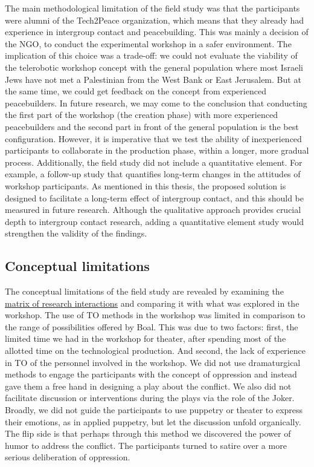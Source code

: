 \documentclass[dissertation,math,vertlayout,pdfa,colorlinks]{aaltoseries}
\begin{document}
The main methodological limitation of the field study was that the participants were alumni of the Tech2Peace organization, which means that they already had experience in intergroup contact and peacebuilding. This was mainly a decision of the NGO, to conduct the experimental workshop in a safer environment. The implication of this choice was a trade-off: we could not evaluate the viability of the telerobotic workshop concept with the general population where most Israeli Jews have not met a Palestinian from the West Bank or East Jerusalem. But at the same time, we could get feedback on the concept from experienced peacebuilders. In future research, we may come to the conclusion that conducting the first part of the workshop (the creation phase) with more experienced peacebuilders and the second part in front of the general population is the best configuration. However, it is imperative that we test the ability of inexperienced participants to collaborate in the production phase, within a longer, more gradual process. Additionally, the field study did not include a quantitative element. For example, a follow-up study that quantifies long-term changes in the attitudes of workshop participants. As mentioned in this thesis, the proposed solution is designed to facilitate a long-term effect of intergroup contact, and this should be measured in future research. Although the qualitative approach provides crucial depth to intergroup contact research, adding a quantitative element study would strengthen the validity of the findings.

\subsection{Conceptual limitations}
The conceptual limitations of the field study are revealed by examining the \hyperref[sec:matrix_of_intersections]{matrix of research interactions} and comparing it with what was explored in the workshop. The use of TO methods in the workshop was limited in comparison to the range of possibilities offered by Boal. This was due to two factors: first, the limited time we had in the workshop for theater, after spending most of the allotted time on the technological production. And second, the lack of experience in TO of the personnel involved in the workshop. We did not use dramaturgical methods to engage the participants with the concept of oppression and instead gave them a free hand in designing a play about the conflict. We also did not facilitate discussion or interventions during the plays via the role of the Joker. Broadly, we did not guide the participants to use puppetry or theater to express their emotions, as in applied puppetry, but let the discussion unfold organically. The flip side is that perhaps through this method we discovered the power of humor to address the conflict. The participants turned to satire over a more serious deliberation of oppression. 
\end{document}
